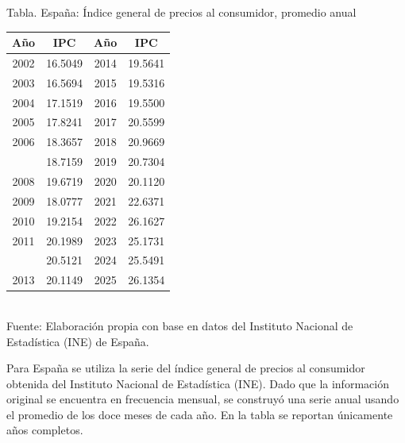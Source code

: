 \documentclass{article}\usepackage[]{graphicx}\usepackage[]{xcolor}
\begin{document}
\begin{center}
Tabla. España: Índice general de precios al consumidor, promedio anual
\end{center}
\begin{center}

\begin{tabular}{cccc}
\toprule
Año & IPC & Año & IPC\\
\midrule
2002 & 16.5049 & 2014 & 19.5641\\
2003 & 16.5694 & 2015 & 19.5316\\
2004 & 17.1519 & 2016 & 19.5500\\
2005 & 17.8241 & 2017 & 20.5599\\
2006 & 18.3657 & 2018 & 20.9669\\
\addlinespace
2007 & 18.7159 & 2019 & 20.7304\\
2008 & 19.6719 & 2020 & 20.1120\\
2009 & 18.0777 & 2021 & 22.6371\\
2010 & 19.2154 & 2022 & 26.1627\\
2011 & 20.1989 & 2023 & 25.1731\\
\addlinespace
2012 & 20.5121 & 2024 & 25.5491\\
2013 & 20.1149 & 2025 & 26.1354\\
\bottomrule
\end{tabular}
\\[0.3em]
{\footnotesize Fuente: Elaboración propia con base en datos del Instituto Nacional de Estadística (INE) de España.}
\end{center}


Para España se utiliza la serie del índice general de precios al consumidor obtenida del Instituto Nacional de Estadística (INE). Dado que la información original se encuentra en frecuencia mensual, se construyó una serie anual usando el promedio de los doce meses de cada año. En la tabla se reportan únicamente años completos.
\end{document}
